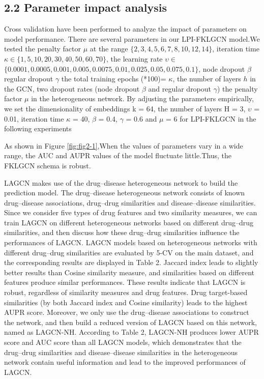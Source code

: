 \documentclass[fleqn,10pt]{wlscirep}
\begin{document}
\subsection*{2.2 Parameter impact analysis}
Cross validation have been performed to analyze the impact of parameters on model performance. There are several parameters in our LPI-FKLGCN model.We tested the penalty factor $\mu$ at the range $\{ 2,3,4,5,6,7,8,10,12,14\} $, iteration time $\kappa$$ \in $$\{ 1,5,10,20,30,40,50,60,70\} $, the learning rate $\upsilon$$ \in $$\{ 0.0001,0.0005,0.001,0.005,0.0075,0.01,0.025,0.05,0.075,0.1\} $, node dropout $\beta$ regular dropout $\gamma$
the total training epochs (*100)= $\kappa$,  the number of layers $h$ in the GCN, 
two dropout rates (node dropout $\beta$ and regular dropout $\gamma$)
the penalty factor $\mu$ in the heterogeneous network.  
By adjusting the parameters empirically,
we set the dimensionality of embeddings k = 64, the number of layers H = 3, 
$\upsilon$ = 0.01, iteration time $\kappa$ = 40, $\beta$ = 0.4, $\gamma$ = 0.6 and $\mu$ = 6 for LPI-FKLGCN in the following experiments

As shown in Figure \ref{fig:fig2-1},When the values of parameters vary in a wide range, the AUC and AUPR values of the model fluctuate little.Thus, the FKLGCN schema is robust.

LAGCN makes use of the drug–disease heterogeneous network to build the prediction model. The drug–disease heterogeneous network consists of known drug–disease associations, drug–drug similarities and disease–disease similarities. Since we consider five types of drug features and two similarity measures, we can train LAGCN on different heterogeneous networks based on different drug–drug similarities, and then discuss how these drug–drug similarities influence the performances of LAGCN.
LAGCN models based on heterogeneous networks with different drug–drug similarities are evaluated by 5-CV on the main dataset, and the corresponding results are displayed in Table 2.
Jaccard index leads to slightly better results than Cosine similarity measure, and similarities based on different features produce similar performances. These results indicate that LAGCN is robust, regardless of similarity measures and drug features. Drug target-based similarities (by both Jaccard index and Cosine similarity) leads to the highest AUPR score. Moreover, we only use the drug–disease associations to construct the network, and then build a reduced version of LAGCN based on this network, named as LAGCN-NH. According to Table 2, LAGCN-NH produces lower AUPR score and AUC score than all LAGCN models, which demonstrates that the drug–drug similarities and disease–disease similarities in the heterogeneous network contain useful information and lead to the improved performances of LAGCN.
\end{document}

